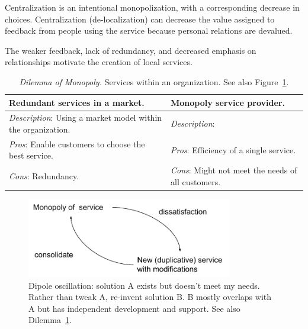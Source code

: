 Centralization is an intentional monopolization, with a corresponding decrease in choices. 
Centralization (de-localization) can decrease the value assigned to feedback from people using the service because personal relations are devalued. 

The weaker feedback, lack of redundancy, and decreased emphasis on relationships motivate the creation of local services. 


\begin{center}
\begin{table}[H] %
\begin{tabular}{ | m{\dilemmatablewidth}| m{\dilemmatablewidth} | } 
  \hline
  \textbf{Redundant services in a market.} &
  \textbf{Monopoly service provider.} \\
  \hline
  \textit{Description}: Using a market model within the organization. &
  \textit{Description}:  \\  
  \hline
  \textit{Pros}: Enable customers to choose the best service. &
  \textit{Pros}: Efficiency of a single service. \\
  \hline
  \textit{Cons}: Redundancy. & 
  \textit{Cons}: Might not meet the needs of all customers. \\
  \hline
\end{tabular}
\caption{
\textit{Dilemma of Monopoly.}
Services within an organization. See also Figure~\ref{fig:market-vs-monopoly}.
}
\label{table:dilemma-org-market-vs-monopoly}
\end{table}
\end{center}


\begin{figure}[H] %
    \centering
    \includegraphics[width=0.8\textwidth]{images/dilemma_market_vs_monopoly.pdf}
    \caption{Dipole oscillation: solution A exists but doesn't meet my needs. Rather than tweak A, re-invent solution B. B mostly overlaps with A but has independent development and support. See also Dilemma~\ref{table:dilemma-org-market-vs-monopoly}.}
    \label{fig:market-vs-monopoly}
\end{figure}

